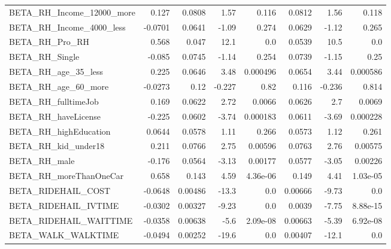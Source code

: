 \begin{tabular}{lrrrrrrr}
BETA\_RH\_Income\_12000\_more    &    0.127 &   0.0808 &    1.57 &    0.116 &        0.0812 &         1.56 &         0.118 \\
BETA\_RH\_Income\_4000\_less     &  -0.0701 &   0.0641 &   -1.09 &    0.274 &        0.0629 &        -1.12 &         0.265 \\
BETA\_RH\_Pro\_RH               &    0.568 &    0.047 &    12.1 &      0.0 &        0.0539 &         10.5 &           0.0 \\
BETA\_RH\_Single               &   -0.085 &   0.0745 &   -1.14 &    0.254 &        0.0739 &        -1.15 &          0.25 \\
BETA\_RH\_age\_35\_less          &    0.225 &   0.0646 &    3.48 & 0.000496 &        0.0654 &         3.44 &      0.000586 \\
BETA\_RH\_age\_60\_more          &  -0.0273 &     0.12 &  -0.227 &     0.82 &         0.116 &       -0.236 &         0.814 \\
BETA\_RH\_fulltimeJob          &    0.169 &   0.0622 &    2.72 &   0.0066 &        0.0626 &          2.7 &        0.0069 \\
BETA\_RH\_haveLicense          &   -0.225 &   0.0602 &   -3.74 & 0.000183 &        0.0611 &        -3.69 &      0.000228 \\
BETA\_RH\_highEducation        &   0.0644 &   0.0578 &    1.11 &    0.266 &        0.0573 &         1.12 &         0.261 \\
BETA\_RH\_kid\_under18          &    0.211 &   0.0766 &    2.75 &  0.00596 &        0.0763 &         2.76 &       0.00575 \\
BETA\_RH\_male                 &   -0.176 &   0.0564 &   -3.13 &  0.00177 &        0.0577 &        -3.05 &       0.00226 \\
BETA\_RH\_moreThanOneCar       &    0.658 &    0.143 &    4.59 & 4.36e-06 &         0.149 &         4.41 &      1.03e-05 \\
BETA\_RIDEHAIL\_COST           &  -0.0648 &  0.00486 &   -13.3 &      0.0 &       0.00666 &        -9.73 &           0.0 \\
BETA\_RIDEHAIL\_IVTIME         &  -0.0302 &  0.00327 &   -9.23 &      0.0 &        0.0039 &        -7.75 &      8.88e-15 \\
BETA\_RIDEHAIL\_WAITTIME       &  -0.0358 &  0.00638 &    -5.6 & 2.09e-08 &       0.00663 &        -5.39 &      6.92e-08 \\
BETA\_WALK\_WALKTIME           &  -0.0494 &  0.00252 &   -19.6 &      0.0 &       0.00407 &        -12.1 &           0.0 \\

\end{tabular}
